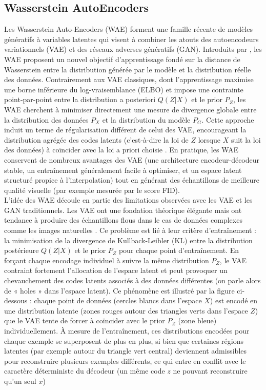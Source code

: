 \subsection{Wasserstein AutoEncoders}

Les Wasserstein Auto-Encoders (WAE) forment une famille récente de modèles génératifs à variables latentes qui visent à combiner les atouts des autoencodeurs variationnels (VAE) et des réseaux adverses génératifs (GAN). Introduits par \citep{tolstikhin2018wasserstein}, les WAE proposent un nouvel objectif d’apprentissage fondé sur la distance de Wasserstein entre la distribution générée par le modèle et la distribution réelle des données. Contrairement aux VAE classiques, dont l’apprentissage maximise une borne inférieure du log-vraisemblance (ELBO) et impose une contrainte point-par-point entre la distribution a posteriori $Q(Z|X)$ et le prior $P_Z$, les WAE cherchent à minimiser directement une mesure de divergence globale entre la distribution des données $P_X$ et la distribution du modèle $P_G$. Cette approche induit un terme de régularisation différent de celui des VAE, encourageant la distribution agrégée des codes latents (c’est-à-dire la loi de $Z$ lorsque $X$ suit la loi des données) à coïncider avec la loi a priori choisie . En pratique, les WAE conservent de nombreux avantages des VAE (une architecture encodeur-décodeur stable, un entraînement généralement facile à optimiser, et un espace latent structuré propice à l’interpolation) tout en générant des échantillons de meilleure qualité visuelle (par exemple mesurée par le score FID).\\

L’idée des WAE découle en partie des limitations observées avec les VAE et les GAN traditionnels. Les VAE ont une fondation théorique élégante mais ont tendance à produire des échantillons flous dans le cas de données complexes comme les images naturelles . Ce problème est lié à leur critère d’entraînement : la minimisation de la divergence de Kullback-Leibler (KL) entre la distribution postérieure $Q(Z|X)$ et le prior $P_Z$ pour chaque point d’entraînement. En forçant chaque encodage individuel à suivre la même distribution $P_Z$, le VAE contraint fortement l’allocation de l’espace latent et peut provoquer un chevauchement des codes latents associés à des données différentes (on parle alors de « holes » dans l’espace latent). Ce phénomène est illustré par la figure ci-dessous : chaque point de données (cercles blancs dans l’espace $X$) est encodé en une distribution latente (zones rouges autour des triangles verts dans l’espace $Z$) que le VAE tente de forcer à coïncider avec le prior $P_Z$ (zone bleue) individuellement. À mesure de l’entraînement, ces distributions encodées pour chaque exemple se superposent de plus en plus, si bien que certaines régions latentes (par exemple autour du triangle vert central) deviennent admissibles pour reconstruire plusieurs exemples différents, ce qui entre en conflit avec le caractère déterministe du décodeur (un même code $z$ ne pouvant reconstruire qu’un seul $x$)


